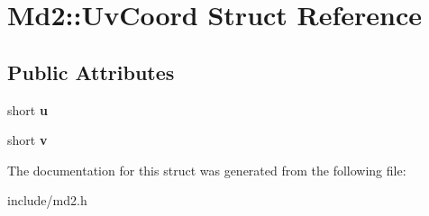 \hypertarget{structMd2_1_1UvCoord}{\section{Md2\-:\-:Uv\-Coord Struct Reference}
\label{structMd2_1_1UvCoord}
}
\subsection*{Public Attributes}
\begin{DoxyCompactItemize}
\item 
\hypertarget{structMd2_1_1UvCoord_a4dbdbfd19b60fe7c0f45ad38f667dd5a}{short {\bfseries u}}\label{structMd2_1_1UvCoord_a4dbdbfd19b60fe7c0f45ad38f667dd5a}

\item 
\hypertarget{structMd2_1_1UvCoord_a3572786e7442d5def6c8a8584c0caa69}{short {\bfseries v}}\label{structMd2_1_1UvCoord_a3572786e7442d5def6c8a8584c0caa69}

\end{DoxyCompactItemize}


The documentation for this struct was generated from the following file\-:\begin{DoxyCompactItemize}
\item 
include/md2.\-h\end{DoxyCompactItemize}
